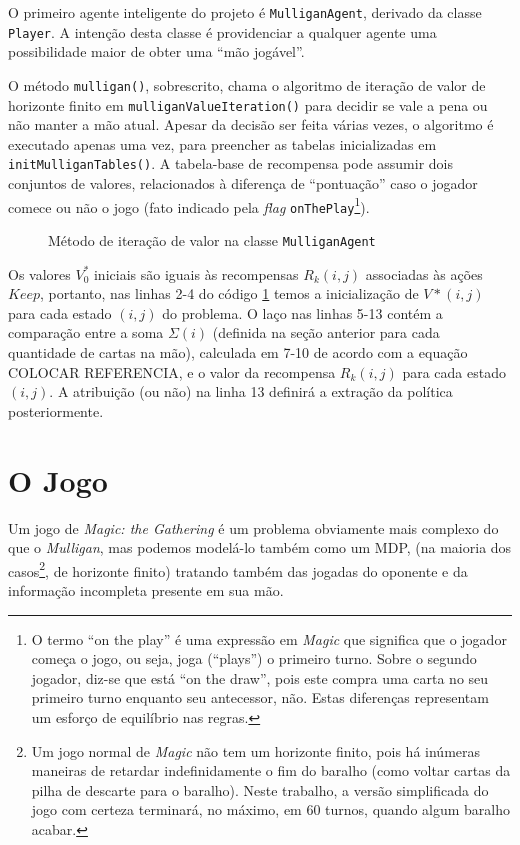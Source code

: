 O primeiro agente inteligente do projeto é \texttt{MulliganAgent}, derivado da classe \texttt{Player}. A intenção desta classe é providenciar a qualquer agente uma possibilidade maior de obter uma ``mão jogável''.



O método \texttt{mulligan()}, sobrescrito, chama o algoritmo de iteração de valor de horizonte finito em \texttt{mulliganValueIteration()} para decidir se vale a pena ou não manter a mão atual. Apesar da decisão ser feita várias vezes, o algoritmo é executado apenas uma vez, para preencher as tabelas inicializadas em \texttt{initMulliganTables()}. A tabela-base de recompensa pode assumir dois conjuntos de valores, relacionados à diferença de ``pontuação'' caso o jogador comece ou não o jogo (fato indicado pela \textit{flag} \texttt{onThePlay}\footnote{O termo ``on the play'' é uma expressão em \textit{Magic} que significa que o jogador começa o jogo, ou seja, joga (``plays'') o primeiro turno. Sobre o segundo jogador, diz-se que está ``on the draw'', pois este compra uma carta no seu primeiro turno enquanto seu antecessor, não. Estas diferenças representam um esforço de equilíbrio nas regras.}).
\begin{figure}[h!]
  
  \label{code:valueit}
  \caption{Método de iteração de valor na classe \texttt{MulliganAgent}}
\end{figure}

Os valores $V^*_0$ iniciais são iguais às recompensas $R_k(i,j)$ associadas às ações $Keep$, portanto, nas linhas 2-4 do código \ref{code:valueit} temos a inicialização de $V*(i, j)$ para cada estado $(i, j)$ do problema. O laço nas linhas 5-13 contém a comparação entre a soma $\Sigma(i)$ (definida na seção anterior para cada quantidade de cartas na mão), calculada em 7-10 de acordo com a equação COLOCAR REFERENCIA, e o valor da recompensa $R_k(i, j)$ para cada estado $(i, j)$. A atribuição (ou não) na linha 13 definirá a extração da política posteriormente.

\newpage

\section{O Jogo}

Um jogo de \textit{Magic: the Gathering} é um problema obviamente mais complexo do que o \textit{Mulligan}, mas podemos modelá-lo também como um MDP,
(na maioria dos casos\footnote{Um jogo normal de \textit{Magic} não tem um horizonte finito, pois há
inúmeras maneiras de retardar indefinidamente o fim do baralho (como voltar cartas da pilha de descarte para o baralho). Neste trabalho, a versão
simplificada do jogo com certeza terminará, no máximo, em 60 turnos, quando algum baralho acabar.}, de horizonte finito) tratando também das jogadas do oponente e da informação incompleta presente em sua mão.

